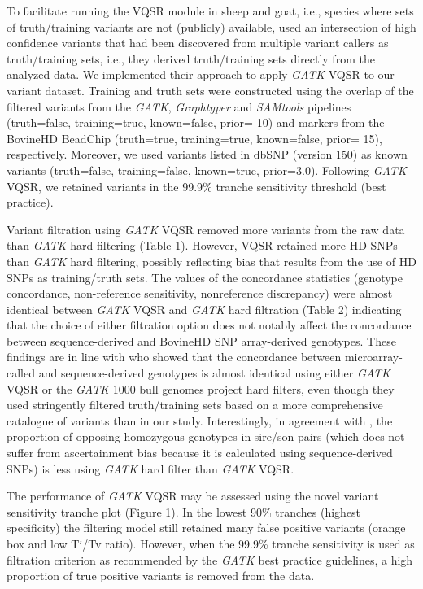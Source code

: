 \documentclass[../main.tex]{subfiles}
\begin{document}
\begin{flushleft}
To facilitate running the VQSR module in sheep and goat, i.e., species where sets of
truth/training variants are not (publicly) available, \citep{alberto2018convergent} used an
intersection of high confidence variants that had been discovered from multiple variant
callers as truth/training sets, i.e., they derived truth/training sets directly from the analyzed
data. We implemented their approach to apply \emph{GATK} VQSR to our variant dataset. Training
and truth sets were constructed using the overlap of the filtered variants from the \emph{GATK},
\emph{Graphtyper} and \emph{SAMtools} pipelines (truth=false, training=true, known=false, prior= 10) and
markers from the BovineHD BeadChip (truth=true, training=true, known=false, prior= 15),
respectively. Moreover, we used variants listed in dbSNP (version 150) as known variants
(truth=false, training=false, known=true, prior=3.0). Following \emph{GATK} VQSR, we retained
variants in the 99.9\% tranche sensitivity threshold (best practice).

\bigskip

Variant filtration using \emph{GATK} VQSR removed more variants from the raw data than \emph{GATK}
hard filtering (Table 1). However, VQSR retained more HD SNPs than \emph{GATK} hard filtering,
possibly reflecting bias that results from the use of HD SNPs as training/truth sets. The
values of the concordance statistics (genotype concordance, non-reference sensitivity, nonreference discrepancy) were almost identical between \emph{GATK} VQSR and \emph{GATK} hard
filtration (Table 2) indicating that the choice of either filtration option does not notably affect
the concordance between sequence-derived and BovineHD SNP array-derived genotypes.
These findings are in line with \citep{vander2018best} who showed that the concordance
between microarray-called and sequence-derived genotypes is almost identical using either
\emph{GATK} VQSR or the \emph{GATK} 1000 bull genomes project hard filters, even though they used
stringently filtered truth/training sets based on a more comprehensive catalogue of variants
than in our study. Interestingly, in agreement with \citep{vander2018best}, the proportion
of opposing homozygous genotypes in sire/son-pairs (which does not suffer from
ascertainment bias because it is calculated using sequence-derived SNPs) is less using
\emph{GATK} hard filter than \emph{GATK} VQSR.

\bigskip

The performance of \emph{GATK} VQSR may be assessed using the novel variant sensitivity
tranche plot (Figure 1). In the lowest 90\% tranches (highest specificity) the filtering model
still retained many false positive variants (orange box and low Ti/Tv ratio). However, when
the 99.9\% tranche sensitivity is used as filtration criterion as recommended by the \emph{GATK}
best practice guidelines, a high proportion of true positive variants is removed from the
data. 


\end{flushleft}
\end{document}
